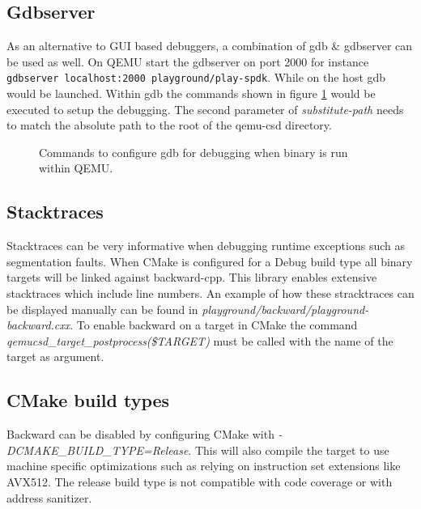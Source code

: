 \documentclass[conference]{IEEEtran}
\newcommand\bashstyle{
	\lstset{
		language=Bash,
		basicstyle=\ttm,
		showstringspaces=false,
		tabsize=2,
		aboveskip=0.2cm,
		belowskip=0.2cm,
		prebreak=\textbackslash,
		extendedchars=true,
		mathescape=false,
		linewidth=8.85cm,
		breaklines=true
	}
}
\newcommand\bashinline[1]{{\bashstyle\lstinline!#1!}}
\newcommand\bashexternal[2][]{{\bashstyle}}
\begin{document}
\subsection{Gdbserver}

As an alternative to GUI based debuggers, a combination of gdb \& gdbserver can
be used as well. On QEMU start the gdbserver on port 2000 for
instance\bashinline{gdbserver localhost:2000 playground/play-spdk}. While on the
host gdb would be launched. Within gdb the commands shown in
figure \ref{fig:gdb-qemu} would be executed to setup the debugging. The second
parameter of \textit{substitute-path} needs to match the absolute path to the
root of the qemu-csd directory.

\begin{center}
	\begin{figure}[H]
		\bashexternal{resources/bash/gdb-qemu.sh}
		\captionsetup{justification=centering}
		\caption{Commands to configure gdb for debugging when binary is run
			within QEMU.}
		\label{fig:gdb-qemu}
	\end{figure}
\end{center}

\subsection{Stacktraces}

Stacktraces can be very informative when debugging runtime exceptions such as
segmentation faults. When CMake is configured for a Debug build type all binary
targets will be linked against backward-cpp. This library enables extensive
stacktraces which include line numbers. An example of how these stracktraces can
be displayed manually can be found in
\textit{playground/backward/playground-backward.cxx}. To enable backward on a
target in CMake the command \textit{qemucsd\_target\_postprocess(\$TARGET)} must
be  called with the name of the target as argument.

\subsection{CMake build types}

Backward can be disabled by configuring CMake with
\textit{-DCMAKE\_BUILD\_TYPE=Release}. This will also compile the target to use
machine specific optimizations such as relying on instruction set extensions
like AVX512. The release build type is not compatible with code coverage or with
address sanitizer.
\end{document}
